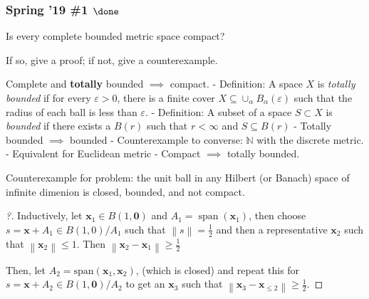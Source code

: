 \hypertarget{spring-19-1-done}{%
\subsubsection{\texorpdfstring{Spring '19 \#1
\(\done\)}{Spring '19 \#1 \textbackslash done}}\label{spring-19-1-done}}

Is every complete bounded metric space compact?

If so, give a proof; if not, give a counterexample.


\begin{solution}

\hfill

\begin{concept}

\hfill

\end{concept}

Complete and \textbf{totally} bounded \(\implies\) compact. -
Definition: A space \(X\) is \emph{totally bounded} if for every
\(\varepsilon >0\), there is a finite cover
\(X \subseteq \cup_\alpha B_\alpha(\varepsilon)\) such that the radius
of each ball is less than \(\varepsilon\). - Definition: A subset of a
space \(S \subset X\) is \emph{bounded} if there exists a \(B(r)\) such
that \(r<\infty\) and \(S \subseteq B(r)\) - Totally bounded
\(\implies\) bounded - Counterexample to converse: \({\mathbb{N}}\) with
the discrete metric. - Equivalent for Euclidean metric - Compact
\(\implies\) totally bounded.

Counterexample for problem: the unit ball in any Hilbert (or Banach)
space of infinite dimenion is closed, bounded, and not compact.

\begin{proof}[?]

Inductively, let \(\mathbf{x}_1 \in B(1, \mathbf{0})\) and
\(A_1 = {\operatorname{span}}{(\mathbf{x}_1)}\), then choose
\(s = \mathbf{x} + A_1 \in B(1,0)/A_1\) such that
\({\left\lVert {s} \right\rVert} = \frac 1 2\) and then a representative
\(\mathbf{x}_2\) such that
\({\left\lVert {\mathbf{x}_2} \right\rVert} \leq 1\). Then
\({\left\lVert {\mathbf{x}_2 - \mathbf{x}_1} \right\rVert} \geq \frac 1 2\)

Then, let \(A_2 = \mathrm{span}(\mathbf{x}_1, \mathbf{x}_2)\), (which is
closed) and repeat this for
\(s = \mathbf{x} + A_2 \in B(1, \mathbf{0})/ A_2\) to get an
\(\mathbf{x}_3\) such that
\({\left\lVert {\mathbf{x}_3 - \mathbf{x}_{\leq 2}} \right\rVert} \geq \frac 1 2\).


\end{proof}
\end{solution}
